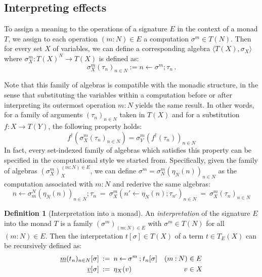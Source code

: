\documentclass[11pt,oneside]{book}
\theoremstyle{definition}
\newtheorem{definition}[theorem]{Definition}
\newcommand{\ul}[1]{%
  \underline{\smash{#1}}
}
\begin{document}

\subsection{Interpreting effects} %

To assign a meaning to the operations of a signature $E$
in the context of a monad $T$,
we assign
to each operation $(m \mathbin: N) \in E$
a computation $\sigma^m \in T(N)$.
Then for every set $X$ of variables,
we can define a corresponding algebra $\langle T(X), \sigma_X \rangle$
where $\sigma_X^m : T(X)^N \rightarrow T(X)$
is defined as:
\[
  \sigma_X^m(\tau_n)_{n \in N} :=
    n \mathbin\leftarrow \sigma^m \mathbin; \tau_n
  \,.
\]

Note that this family of algebras
is compatible with the monadic structure,
in the sense that substituting the variables
within a computation
before or after interpreting
its outermost operation $m \mathbin: N$
yields the same result.
In other words,
for a family of arguments $(\tau_n)_{n \in N}$ taken in $T(X)$
and for a substitution $f : X \rightarrow T(Y)$,
the following property holds:
\begin{equation} \label{eqn:monadint}
  f^\dagger(\sigma_X^m(\tau_n)_{n \in N}) =
  \sigma_Y^m(f^\dagger(\tau_n))_{n \in N}
\end{equation}
In fact,
every set-indexed family of algebras which satisfies this property
can be specified in the computational
style we started from.
Specifically,
given the family of algebras $(\sigma_X^m)_X^{(m \mathbin: N) \in E}$,
we can define
$\sigma^m = \sigma_N^m(\eta_N(n))_{n \in N}$
as the computation associated with $m \mathbin: N$
and rederive the same algebras:
\[
  n \mathbin\leftarrow \sigma^N_m(\eta_N(n))_{n \in N} \mathbin; \tau_n
  \: = \:
  \sigma^m_X(n' \mathbin\leftarrow \eta_N(n) \mathbin; \tau_{n'})_{n \in N}
  \: = \:
  \sigma^m_X(\tau_n)_{n \in N}
\]

\begin{definition}[Interpretation into a monad] \label{def:monadint}
An \emph{interpretation} of the signature $E$ into the monad $T$
is a family $(\sigma^m)_{(m \mathbin: N) \in E}$
with $\sigma^m \in T(N)$ for all $(m \mathbin: N) \in E$.
Then the interpretation $t[\sigma] \in T(X)$
of a term $t \in T_E(X)$
can be recursively defined as:
\begin{align*}
  \ul{m}(t_n)_{n \in N}[\sigma] \: &:= \:
    n \mathbin\leftarrow \sigma^m \mathbin; t_n[\sigma]
    & (m \mathbin: N) &\in E
  \\
  \ul{v}[\sigma] \: &:= \: \eta_X(v)
    & v &\in X
\end{align*}
\end{definition}
\end{document}
